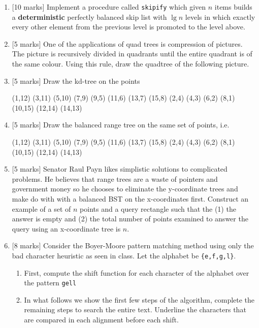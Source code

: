 \documentclass[11pt]{article}
\begin{document}
\begin{enumerate}
\item {[10 marks]}  Implement a procedure called {\tt skipify} which given $n$
 items builds a {\bf deterministic} perfectly balanced skip list with $\lg n$ levels 
 in which exactly every other element from the previous level is promoted to the level 
 above.

\item 	{[5 marks]}
One of the applications of quad trees is compression of pictures. The picture is recursively divided in quadrants until the entire quadrant is of the same colour. Using this rule, draw the quadtree of the following picture.


\item {[5 marks]} Draw the kd-tree on the points

(1,12) (3,11) (5,10) (7,9) (9,5) (11,6) (13,7) (15,8) 
(2,4) (4,3) (6,2) (8,1) (10,15) (12,14) (14,13) 

\item {[5 marks]} Draw the balanced range tree on the same set of points, i.e.

(1,12) (3,11) (5,10) (7,9) (9,5) (11,6) (13,7) (15,8)
(2,4) (4,3) (6,2) (8,1) (10,15) (12,14) (14,13)


\item {[5 marks]} Senator Raul Payn likes simplistic solutions to complicated problems. He believes
that range trees are a waste of pointers and government money so he chooses to eliminate
the y-coordinate trees and make do with with a balanced BST on the x-coordinates first.
Construct an example of a set of $n$ points and a query rectangle such that the 
(1) the answer is empty and (2) the total number of points examined to answer the
query using an x-coordinate tree is $n$.


\item	{[8 marks]} Consider the Boyer-Moore pattern matching method using only the bad character heuristic as seen in class. Let the alphabet be \verb+{e,f,g,l}+.
    
\begin{enumerate}
\item 	First, compute the shift function for each character of the alphabet over the pattern {\tt gell}
\item	In what follows we show the first few steps of the algorithm, complete the remaining steps to search the entire text. Underline the characters that are compared in each alignment before each shift.


\end{enumerate}
\end{enumerate}
\end{document}

